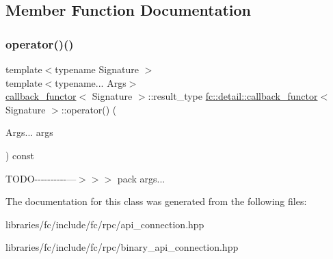 \subsection{Member Function Documentation}
\mbox{\label{classfc_1_1detail_1_1callback__functor_ad5b8e454d89e73b403deddca38dd48b8}} 
\subsubsection{\texorpdfstring{operator()()}{operator()()}}
{\footnotesize\ttfamily template$<$typename Signature $>$ \\
template$<$typename... Args$>$ \\
\mbox{\hyperlink{classfc_1_1detail_1_1callback__functor}{callback\+\_\+functor}}$<$ Signature $>$\+::result\+\_\+type \mbox{\hyperlink{classfc_1_1detail_1_1callback__functor}{fc\+::detail\+::callback\+\_\+functor}}$<$ Signature $>$\+::operator() (\begin{DoxyParamCaption}\item[{Args...}]{args }\end{DoxyParamCaption}) const}

T\+O\+D\+O-\/-\/-\/-\/-\/-\/-\/-\/-\/-\/---$>$$>$$>$ pack args... 

The documentation for this class was generated from the following files\+:\begin{DoxyCompactItemize}
\item 
libraries/fc/include/fc/rpc/api\+\_\+connection.\+hpp\item 
libraries/fc/include/fc/rpc/binary\+\_\+api\+\_\+connection.\+hpp\end{DoxyCompactItemize}
